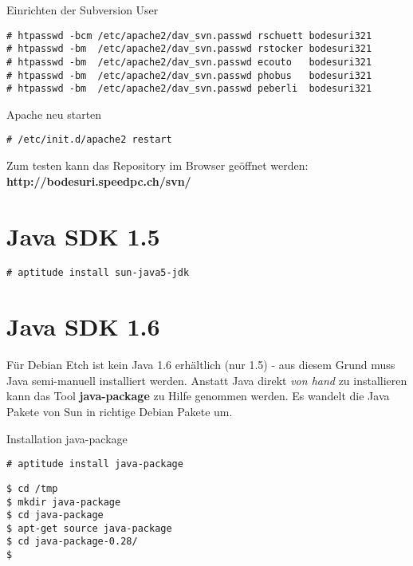 \documentclass[a4paper,12pt,halfparskip,DIV14]{scrreprt}
\begin{document}
Einrichten der Subversion User

\begin{verbatim}
# htpasswd -bcm /etc/apache2/dav_svn.passwd rschuett bodesuri321
# htpasswd -bm  /etc/apache2/dav_svn.passwd rstocker bodesuri321
# htpasswd -bm  /etc/apache2/dav_svn.passwd ecouto   bodesuri321
# htpasswd -bm  /etc/apache2/dav_svn.passwd phobus   bodesuri321
# htpasswd -bm  /etc/apache2/dav_svn.passwd peberli  bodesuri321
\end{verbatim}

Apache neu starten

\begin{verbatim}
# /etc/init.d/apache2 restart
\end{verbatim}

Zum testen kann das Repository im Browser geöffnet werden: \textbf{http://bodesuri.speedpc.ch/svn/} 



\section{Java SDK 1.5} %
\label{sec:java_sdk_1_5}

\begin{verbatim}
# aptitude install sun-java5-jdk
\end{verbatim}


\section{Java SDK 1.6} %
\label{sec:java_sdk}

Für Debian Etch ist kein Java 1.6 erhältlich (nur 1.5) - aus diesem Grund muss Java semi-manuell installiert werden. Anstatt Java direkt \emph{von hand} zu installieren kann das Tool \textbf{java-package} zu Hilfe genommen werden. Es wandelt die Java Pakete von Sun in richtige Debian Pakete um. 

Installation java-package

\begin{verbatim}
# aptitude install java-package  
\end{verbatim}

\begin{verbatim}
$ cd /tmp
$ mkdir java-package
$ cd java-package
$ apt-get source java-package
$ cd java-package-0.28/
$
\end{verbatim}
\end{document}
